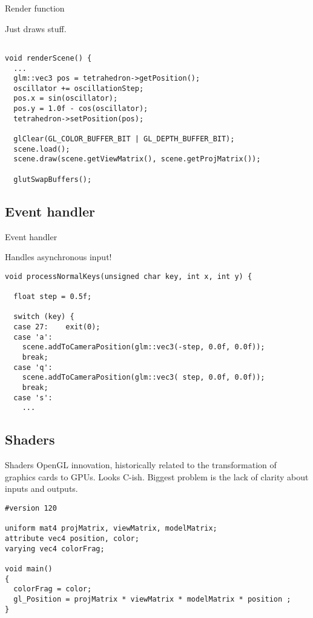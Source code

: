 \documentclass[12pt]{article}
\begin{document}
\begin{frame}[fragile]{Render function}

Just draws stuff.

\begin{verbatim}

void renderScene() {
  ...
  glm::vec3 pos = tetrahedron->getPosition();
  oscillator += oscillationStep;
  pos.x = sin(oscillator);
  pos.y = 1.0f - cos(oscillator);
  tetrahedron->setPosition(pos);

  glClear(GL_COLOR_BUFFER_BIT | GL_DEPTH_BUFFER_BIT);
  scene.load();
  scene.draw(scene.getViewMatrix(), scene.getProjMatrix());

  glutSwapBuffers();
\end{verbatim}
\end{frame}


\subsection{Event handler}

\begin{frame}[fragile]{Event handler}

Handles asynchronous input!

\begin{verbatim}
void processNormalKeys(unsigned char key, int x, int y) {

  float step = 0.5f;

  switch (key) {
  case 27:    exit(0);
  case 'a':
    scene.addToCameraPosition(glm::vec3(-step, 0.0f, 0.0f));
    break;
  case 'q':
    scene.addToCameraPosition(glm::vec3( step, 0.0f, 0.0f));
    break;
  case 's':
    ...
\end{verbatim}
\end{frame}


\subsection{Shaders}

\begin{frame}[fragile]{Shaders}
OpenGL innovation, historically related to the transformation of
graphics cards to GPUs.  Looks C-ish.  Biggest problem is the lack of
clarity about inputs and outputs.

\begin{verbatim}
#version 120

uniform mat4 projMatrix, viewMatrix, modelMatrix;
attribute vec4 position, color;
varying vec4 colorFrag;

void main()
{
  colorFrag = color;
  gl_Position = projMatrix * viewMatrix * modelMatrix * position ;
}
\end{verbatim}
\end{frame}
\end{document}
